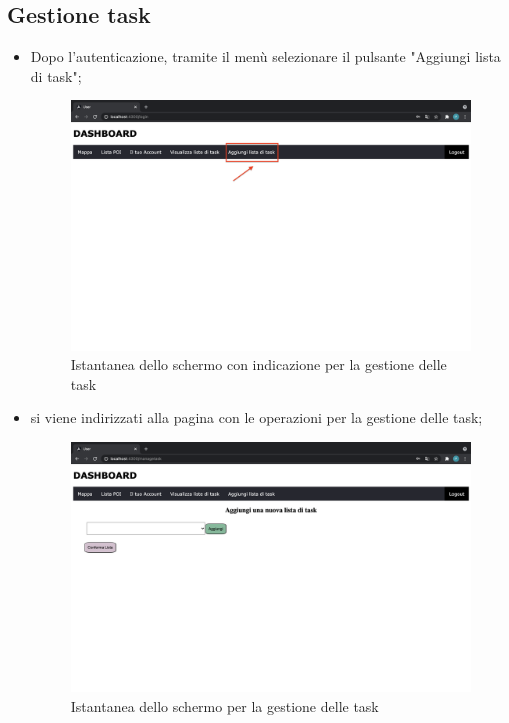 \subsection{Gestione task}
\begin{itemize}
    \item Dopo l'autenticazione, tramite il menù selezionare il pulsante "Aggiungi lista di task";
        \begin{figure}[H]
        \centering
        \includegraphics[scale=0.2]{res/images/dashboard9.png}
        \caption{Istantanea dello schermo con indicazione per la gestione delle task}
        \end{figure}
    \item si viene indirizzati alla pagina con le operazioni per la gestione delle task; 
    \begin{figure}[H]
        \centering
        \includegraphics[scale=0.12]{res/images/gestiscitask.png}
        \caption{Istantanea dello schermo per la gestione delle task}
    \end{figure}
\end{itemize}





